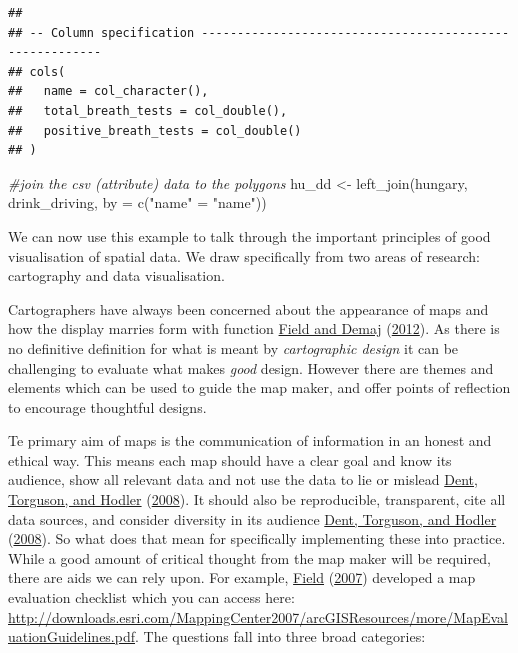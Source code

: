 \documentclass[
]{book}
\newenvironment{Shaded}{\begin{snugshade}}{\end{snugshade}}
\newcommand{\AttributeTok}[1]{\textcolor[rgb]{0.77,0.63,0.00}{#1}}
\newcommand{\CommentTok}[1]{\textcolor[rgb]{0.56,0.35,0.01}{\textit{#1}}}
\newcommand{\FunctionTok}[1]{\textcolor[rgb]{0.00,0.00,0.00}{#1}}
\newcommand{\NormalTok}[1]{#1}
\newcommand{\OtherTok}[1]{\textcolor[rgb]{0.56,0.35,0.01}{#1}}
\newcommand{\StringTok}[1]{\textcolor[rgb]{0.31,0.60,0.02}{#1}}
\begin{document}
\begin{verbatim}
## 
## -- Column specification --------------------------------------------------------
## cols(
##   name = col_character(),
##   total_breath_tests = col_double(),
##   positive_breath_tests = col_double()
## )
\end{verbatim}

\begin{Shaded}
\begin{Highlighting}[]
\CommentTok{\#join the csv (attribute) data to the polygons}
\NormalTok{hu\_dd }\OtherTok{\textless{}{-}} \FunctionTok{left\_join}\NormalTok{(hungary, drink\_driving, }\AttributeTok{by =} \FunctionTok{c}\NormalTok{(}\StringTok{"name"} \OtherTok{=} \StringTok{"name"}\NormalTok{))}
\end{Highlighting}
\end{Shaded}

We can now use this example to talk through the important principles of good visualisation of spatial data. We draw specifically from two areas of research: cartography and data visualisation.

Cartographers have always been concerned about the appearance of maps and how the display marries form with function \protect\hyperlink{ref-Field_2012}{Field and Demaj} (\protect\hyperlink{ref-Field_2012}{2012}). As there is no definitive definition for what is meant by \emph{cartographic design} it can be challenging to evaluate what makes \emph{good} design. However there are themes and elements which can be used to guide the map maker, and offer points of reflection to encourage thoughtful designs.

Te primary aim of maps is the communication of information in an honest and ethical way. This means each map should have a clear goal and know its audience, show all relevant data and not use the data to lie or mislead \protect\hyperlink{ref-Dent_2008}{Dent, Torguson, and Hodler} (\protect\hyperlink{ref-Dent_2008}{2008}). It should also be reproducible, transparent, cite all data sources, and consider diversity in its audience \protect\hyperlink{ref-Dent_2008}{Dent, Torguson, and Hodler} (\protect\hyperlink{ref-Dent_2008}{2008}). So what does that mean for specifically implementing these into practice. While a good amount of critical thought from the map maker will be required, there are aids we can rely upon. For example, \protect\hyperlink{ref-Field_2007}{Field} (\protect\hyperlink{ref-Field_2007}{2007}) developed a map evaluation checklist which you can access here: \url{http://downloads.esri.com/MappingCenter2007/arcGISResources/more/MapEvaluationGuidelines.pdf}. The questions fall into three broad categories:
\end{document}
